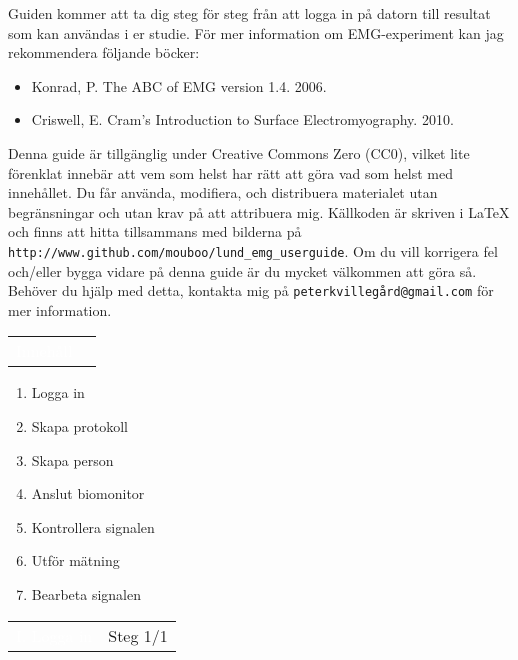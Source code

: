 \documentclass[10pt,a4paper]{article}
\newcommand{\pagetitle}[2] {
	\begin{tabularx}{\linewidth}{>{\columncolor{darkpurple}}c >{\columncolor{lightpurple!35}}X}
		\LARGE \textcolor{white}{{#1}} & \LARGE {#2} \\[3pt]
	\end{tabularx}
}
\begin{document}
Guiden kommer att ta dig steg för steg från att logga in på datorn till resultat som kan användas i er studie. För mer information om EMG-experiment kan jag rekommendera följande böcker:
\begin{itemize}
	\item Konrad, P. The ABC of EMG version 1.4. 2006.
	\item Criswell, E. Cram's Introduction to Surface Electromyography. 2010.
\end{itemize}

Denna guide är tillgänglig under Creative Commons Zero (CC0), vilket lite förenklat innebär att vem som helst har rätt att göra vad som helst med innehållet. Du får använda, modifiera, och distribuera materialet utan begränsningar och utan krav på att attribuera mig. Källkoden är skriven i \LaTeX{} och finns att hitta tillsammans med bilderna på \verb|http://www.github.com/mouboo/lund_emg_userguide|. Om du vill korrigera fel och/eller bygga vidare på denna guide är du mycket välkommen att göra så. Behöver du hjälp med detta, kontakta mig på \verb|peterkvillegård@gmail.com| för mer information.

\newpage


\pagetitle{Innehåll}{}\par
\vspace{3em}
{\Large

\begin{enumerate}[label={\Roman*},align=left]
\item Logga in 
\item Skapa protokoll 
\item Skapa person 
\item Anslut biomonitor 
\item Kontrollera signalen 
\item Utför mätning 
\item Bearbeta signalen 
\end{enumerate}
}

\newpage
{}


\pagetitle{I. Logga in}{Steg 1/1}
\end{document}
